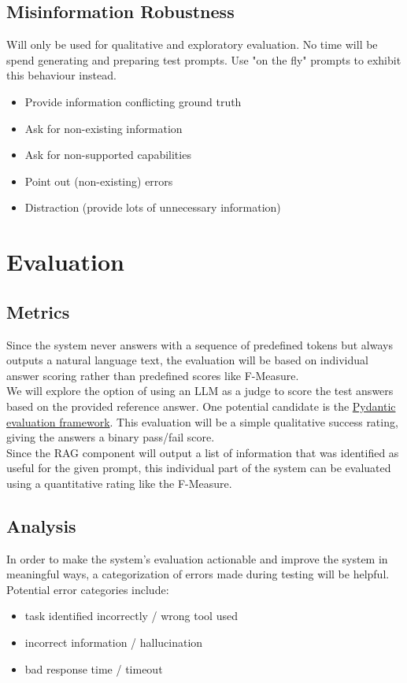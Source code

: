 \documentclass{article}
\begin{document}
\subsection{Misinformation Robustness}
Will only be used for qualitative and exploratory evaluation. No time will be spend generating and preparing test prompts. Use "on the fly" prompts to exhibit this behaviour instead.
\begin{itemize}
    \item Provide information conflicting ground truth
    \item Ask for non-existing information
    \item Ask for non-supported capabilities
    \item Point out (non-existing) errors
    \item Distraction (provide lots of unnecessary information) 
\end{itemize}


\section{Evaluation}

\subsection{Metrics}
Since the system never answers with a sequence of predefined tokens but always outputs a natural language text, the evaluation will be based on individual answer scoring rather than predefined scores like F-Measure.\\

We will explore the option of using an LLM as a judge to score the test answers based on the provided reference answer. One potential candidate is the \href{https://ai.pydantic.dev/evals/#evaluation-with-llmjudge}{Pydantic evaluation framework}. This evaluation will be a simple qualitative success rating, giving the answers a binary pass/fail score.\\

Since the RAG component will output a list of information that was identified as useful for the given prompt, this individual part of the system can be evaluated using a quantitative rating like the F-Measure.

\subsection{Analysis}
In order to make the system's evaluation actionable and improve the system in meaningful ways, a categorization of errors made during testing will be helpful. Potential error categories include:
\begin{itemize}
    \item task identified incorrectly / wrong tool used
    \item incorrect information / hallucination
    \item bad response time / timeout
\end{itemize}
\end{document}
